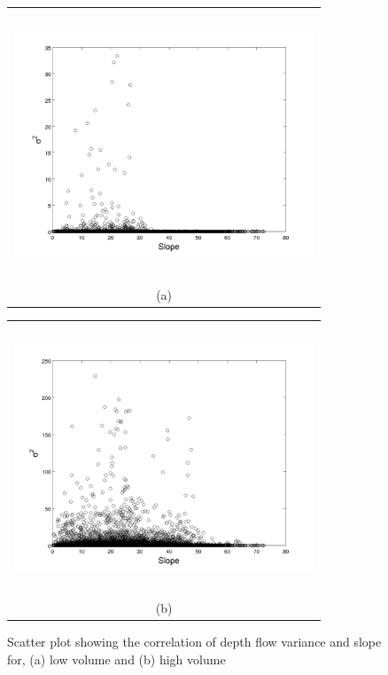 \documentclass[a4paper,fleqn]{article}
\begin{document}
\begin{figure}[H]
    \begin{minipage}[b]{0.6\textwidth}
        \begin{tabular}{c}
        \includegraphics[width=9cm,height=8cm,keepaspectratio]{slope_vs_sigma2.jpg}\\
        (a)
        \end{tabular}
    \end{minipage}
    \begin{minipage}{0.6\textwidth}
        \begin{tabular}{c}
        \includegraphics[width=9cm,height=8cm,keepaspectratio]{slope_vs_sigma2_high_vol.jpg}\\
        (b)
        \end{tabular}
    \end{minipage} 
\caption{Scatter plot showing the correlation of depth flow variance and slope for, (a) low volume and (b) high volume}
\label{fig6}  
\end{figure}
\end{document}
